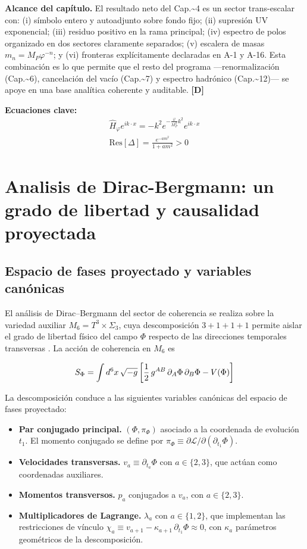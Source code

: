 ﻿\documentclass[11pt,letterpaper]{article}
\begin{document}
\textbf{Alcance del capítulo.} El resultado neto del Cap.\textasciitilde{}4 es un sector trans-escalar con: (i) símbolo entero y autoadjunto sobre fondo fijo; (ii) supresión UV exponencial; (iii) residuo positivo en la rama principal; (iv) espectro de polos organizado en dos sectores claramente separados; (v) escalera de masas $m_n = M_P\varphi^{-n}$; y (vi) fronteras explícitamente declaradas en A-1 y A-16. Esta combinación es lo que permite que el resto del programa ---renormalización (Cap.\textasciitilde{}6), cancelación del vacío (Cap.\textasciitilde{}7) y espectro hadrónico (Cap.\textasciitilde{}12)--- se apoye en una base analítica coherente y auditable. \textbf{[D]}

\textbf{Ecuaciones clave:}
\begin{align*}
    \hat{H}_\varphi e^{ik\cdot x} = -k^2 e^{-\frac{\varphi}{M_P^2}k^2}e^{ik\cdot x} \\
    \mathrm{Res}[\Delta] = \frac{e^{-am^2}}{1+am^2} > 0
\end{align*}
\section{Analisis de Dirac-Bergmann: un grado de libertad y causalidad proyectada}
\subsection{Espacio de fases proyectado y variables canónicas}
El análisis de Dirac--Bergmann del sector de coherencia se realiza sobre la variedad auxiliar $M_6 = T^3 \times \Sigma_3$, cuya descomposición $3+1+1+1$ permite aislar el grado de libertad físico del campo $\Phi$ respecto de las direcciones temporales transversas \cite{Dirac1950,Bergmann1949}. La acción de coherencia en $M_6$ es

\begin{equation*}
  \resizebox{\ifdim\width>\linewidth \linewidth\else\width\fi}{!}{$\displaystyle S_\Phi = \int d^6x\,\sqrt{-g}\left[\frac{1}{2}\,g^{AB}\,\partial_A\Phi\,\partial_B\Phi - V(\Phi)\right]$}
\end{equation*}

La descomposición conduce a las siguientes variables canónicas del espacio de fases proyectado:

\begin{itemize}[leftmargin=*]
\item \textbf{Par conjugado principal.} $(\Phi, \pi_\Phi)$ asociado a la coordenada de evolución $t_1$. El momento conjugado se define por $\pi_\Phi \equiv \partial\mathcal{L}/\partial(\partial_{t_1}\Phi)$.
\item \textbf{Velocidades transversas.} $v_a \equiv \partial_{t_a}\Phi$ con $a \in \{2, 3\}$, que actúan como coordenadas auxiliares.
\item \textbf{Momentos transversos.} $p_a$ conjugados a $v_a$, con $a \in \{2, 3\}$.
\item \textbf{Multiplicadores de Lagrange.} $\lambda_a$ con $a \in \{1, 2\}$, que implementan las restricciones de vínculo $\chi_a \equiv v_{a+1} - \kappa_{a+1}\,\partial_{t_1}\Phi \approx 0$, con $\kappa_a$ parámetros geométricos de la descomposición.
\end{itemize}
\end{document}
